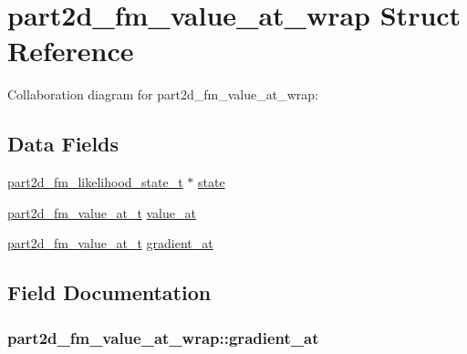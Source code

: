 \hypertarget{structpart2d__fm__value__at__wrap}{}\section{part2d\+\_\+fm\+\_\+value\+\_\+at\+\_\+wrap Struct Reference}
\label{structpart2d__fm__value__at__wrap}


Collaboration diagram for part2d\+\_\+fm\+\_\+value\+\_\+at\+\_\+wrap\+:
\subsection*{Data Fields}
\begin{DoxyCompactItemize}
\item 
\hyperlink{forwardmodel_8h_a98fb20f9b43766d69f349eea85d1b7f0}{part2d\+\_\+fm\+\_\+likelihood\+\_\+state\+\_\+t} $\ast$ \hyperlink{structpart2d__fm__value__at__wrap_af465cf1ca99247852217137fc988947c}{state}
\item 
\hyperlink{forwardmodel_8h_a75f540640c95db909125ed5c5eb7a1f3}{part2d\+\_\+fm\+\_\+value\+\_\+at\+\_\+t} \hyperlink{structpart2d__fm__value__at__wrap_a1a124ca19ef22647d0fb8c5fb5650f5e}{value\+\_\+at}
\item 
\hyperlink{forwardmodel_8h_a75f540640c95db909125ed5c5eb7a1f3}{part2d\+\_\+fm\+\_\+value\+\_\+at\+\_\+t} \hyperlink{structpart2d__fm__value__at__wrap_a45e924e05e653fc05e89dd9a0440b7c7}{gradient\+\_\+at}
\end{DoxyCompactItemize}


\subsection{Field Documentation}
\subsubsection[{\texorpdfstring{gradient\+\_\+at}{gradient_at}}]{ part2d\+\_\+fm\+\_\+value\+\_\+at\+\_\+wrap\+::gradient\+\_\+at}\hypertarget{structpart2d__fm__value__at__wrap_a45e924e05e653fc05e89dd9a0440b7c7}{}\label{structpart2d__fm__value__at__wrap_a45e924e05e653fc05e89dd9a0440b7c7}
